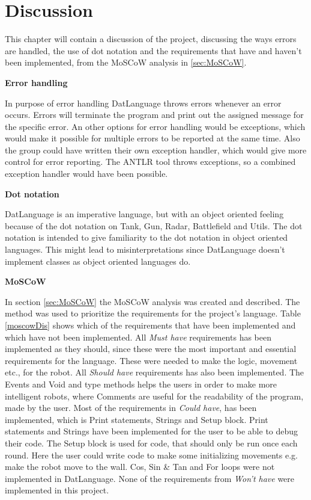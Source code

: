 \chapter{Discussion} \label{chap:Discussion}
This chapter will contain a discussion of the project, discussing the ways errors are handled, the use of dot notation and the requirements that have and haven't been implemented, from the MoSCoW analysis in \ref{sec:MoSCoW}. \newline

\textbf{\Large{Error handling}}

In purpose of error handling DatLanguage throws errors whenever an error occurs. Errors will terminate the program and print out the assigned message for the specific error.
An other options for error handling would be exceptions, which would make it possible for multiple errors to be reported at the same time. Also the group could have written their own exception handler, which would give more control for error reporting. The ANTLR tool throws exceptions, so a combined exception handler would have been possible. \newline

\textbf{\Large{Dot notation}}

DatLanguage is an imperative language, but with an object oriented feeling because of the dot notation on Tank, Gun, Radar, Battlefield and Utils. The dot notation is intended to give familiarity to the dot notation in object oriented languages. This might lead to misinterpretations since DatLanguage doesn't implement classes as object oriented languages do.\newline 

\textbf{\Large{MoSCoW}}

In section \ref{sec:MoSCoW} the MoSCoW analysis was created and described. The method was used to prioritize the requirements for the project's language. Table \ref{moscowDis} shows which of the requirements that have been implemented and which have not been implemented. \newline
All \textit{Must have} requirements has been implemented as they should, since these were the most important and essential requirements for the language. These were needed to make the logic, movement etc., for the robot. \newline
All \textit{Should have} requirements has also been implemented. The Events and Void and type methods helps the users in order to make more intelligent robots, where Comments are useful for the readability of the program, made by the user. \newline
Most of the requirements in \textit{Could have}, has been implemented, which is Print statements, Strings and Setup block. Print statements and Strings have been implemented for the user to be able to debug their code. The Setup block is used for code, that should only be run once each round. Here the user could write code to make some initializing movements e.g. make the  robot move to the wall. Cos, Sin \& Tan and For loops were not implemented in DatLanguage. \newline
None of the requirements from \textit{Won't have} were implemented in this project.


